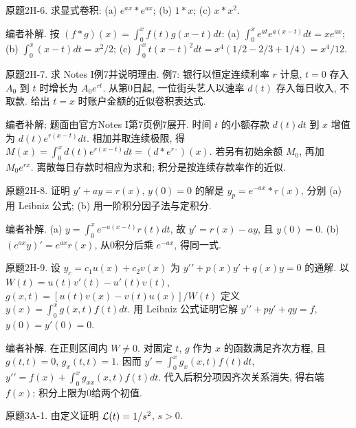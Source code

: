 \begin{exercise}\label{cw:bank-2H-6}
原题2H-6. 求显式卷积: (a) $e^{ax}*e^{ax}$; (b) $1*x$; (c) $x*x^2$.
\end{exercise}
\begin{solution}
编者补解. 按 $(f*g)(x)=\int_0^xf(t)g(x-t)dt$: (a) $\int_0^xe^{at}e^{a(x-t)}dt=xe^{ax}$; (b) $\int_0^x(x-t)dt=x^2/2$; (c) $\int_0^xt(x-t)^2dt=x^4(1/2-2/3+1/4)=x^4/12$.
\end{solution}
\begin{exercise}\label{cw:bank-2H-7}
原题2H-7. 求 Notes I例7并说明理由. 例7: 银行以恒定连续利率 $r$ 计息, $t=0$ 存入 $A_0$ 到 $t$ 时增长为 $A_0e^{rt}$. 从第0日起, 一位街头艺人以速率 $d(t)$ 存入每日收入, 不取款. 给出 $t=x$ 时账户金额的近似卷积表达式.
\end{exercise}
\begin{solution}
编者补解; 题面由官方Notes I第7页例7展开. 时间 $t$ 的小额存款 $d(t)dt$ 到 $x$ 增值为 $d(t)e^{r(x-t)}dt$. 相加并取连续极限, 得 $M(x)=\int_0^xd(t)e^{r(x-t)}dt=(d*e^{r\cdot})(x)$. 若另有初始余额 $M_0$, 再加 $M_0e^{rx}$. 离散每日存款时相应为求和; 积分是按连续存款率作的近似.
\end{solution}
\begin{exercise}\label{cw:bank-2H-8}
原题2H-8. 证明 $y\prime+ay=r(x)$, $y(0)=0$ 的解是 $y_p=e^{-ax}*r(x)$, 分别 (a) 用 Leibniz 公式; (b) 用一阶积分因子法与定积分.
\end{exercise}
\begin{solution}
编者补解. (a) $y=\int_0^xe^{-a(x-t)}r(t)dt$, 故 $y\prime=r(x)-ay$, 且 $y(0)=0$. (b) $(e^{ax}y)\prime=e^{ax}r(x)$, 从0积分后乘 $e^{-ax}$, 得同一式.
\end{solution}
\begin{exercise}\label{cw:bank-2H-9}
原题2H-9. 设 $y_c=c_1u(x)+c_2v(x)$ 为 $y\prime\prime+p(x)y\prime+q(x)y=0$ 的通解. 以 $W(t)=u(t)v\prime(t)-u\prime(t)v(t)$, $g(x,t)=[u(t)v(x)-v(t)u(x)]/W(t)$ 定义 $y(x)=\int_0^xg(x,t)f(t)dt$. 用 Leibniz 公式证明它解 $y\prime\prime+py\prime+qy=f$, $y(0)=y\prime(0)=0$.
\end{exercise}
\begin{solution}
编者补解. 在正则区间内 $W\ne0$. 对固定 $t$, $g$ 作为 $x$ 的函数满足齐次方程, 且 $g(t,t)=0$, $g_x(t,t)=1$. 因而 $y\prime=\int_0^xg_x(x,t)f(t)dt$, $y\prime\prime=f(x)+\int_0^xg_{xx}(x,t)f(t)dt$. 代入后积分项因齐次关系消失, 得右端 $f(x)$; 积分上限为0给两个初值.
\end{solution}
\begin{exercise}\label{cw:bank-3A-1}
原题3A-1. 由定义证明 $\mathcal L(t)=1/s^2$, $s>0$.
\end{exercise}

